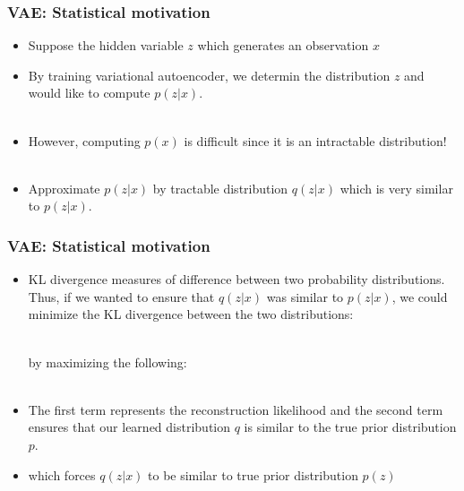 \begin{frame}
\frametitle{VAE: Statistical motivation}

\begin{itemize}
\item Suppose the hidden variable $z$ which generates an observation $x$
\pause
\item By training variational autoencoder, we determin the distribution $z$ and would like to compute $p(z|x)$. \\
\\
\vspace{5pt}
\pause
\item \raggedright{However, computing $p(x)$ is difficult since it is an intractable distribution!} \\
\\
\vspace{5pt}
\pause
\item \raggedright{Approximate $p(z|x)$ by tractable distribution $q(z|x)$ which is very similar to $p(z|x)$.} \\

\end{itemize}
\end{frame}

\begin{frame}
\frametitle{VAE: Statistical motivation}

\begin{itemize}
\item \raggedright{KL divergence measures of difference between two probability distributions. Thus, if we wanted to ensure that $q(z|x)$ was similar to $p(z|x)$, we could minimize the KL divergence between the two distributions:} \\
 \\
\pause
\raggedright{by maximizing the following:}\\
\paused
{} \\
\vspace{5pt}
\item \raggedright{The first term represents the reconstruction likelihood and the second term ensures that our learned distribution $q$ is similar to the true prior distribution $p$.}
\item which forces $q(z|x)$ to be similar to true prior distribution $p(z)$

\end{itemize}
\end{frame}


